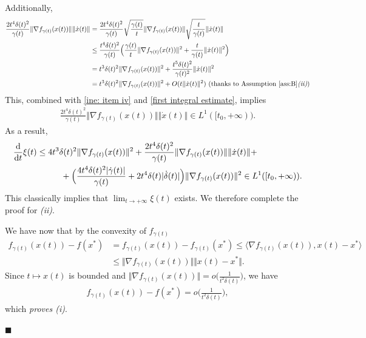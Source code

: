 \documentclass[11pt]{article}
\numberwithin{equation}{section}
\newenvironment{proof}{\bigskip\noindent{\bf Proof.}}{\hfill $\blacksquare$ \par\bigskip\noindent}
\begin{document}
\begin{proof}
Additionally,  
\begin{align*}
\frac{2t^4\delta(t)^2}{\gamma(t)}\Vert \nabla f_{\gamma(t)}(x(t)) \Vert \Vert \dot{x}(t) \Vert &=\frac{2t^4\delta(t)^2}{\gamma(t)}\sqrt{\frac{\gamma(t)}{t}}\Vert \nabla f_{\gamma(t)}(x(t)) \Vert \sqrt{\frac{t}{\gamma(t)}}\Vert \dot{x}(t) \Vert \\
&\le \frac{t^4\delta(t)^2}{\gamma(t)}\Big(\frac{\gamma(t)}{t}\Vert \nabla f _{\gamma(t)}(x(t)) \Vert^2+\frac{t}{\gamma(t)}\Vert \dot{x}(t) \Vert^2\Big) \\
&=t^3\delta(t)^2\Vert \nabla f _{\gamma(t)}(x(t)) \Vert^2+\frac{t^5\delta(t)^2}{\gamma(t)^2}\Vert \dot{x}(t) \Vert^2 \\
&=t^3\delta(t)^2\Vert \nabla f _{\gamma(t)}(x(t)) \Vert^2+O(t\Vert \dot{x}(t) \Vert^2) \text{ (thanks to Assumption \ref{ass:B}\textit{(ii)})}
\end{align*}
This, combined with \eqref{ine: item iv} and \eqref{first integral estimate}, implies 
\begin{align*}
 \frac{2t^4\delta(t)^2}{\gamma(t)}\Vert \nabla f_{\gamma(t)}(x(t)) \Vert \Vert \dot{x}(t) \Vert  \in L^1([t_0,+\infty)).   
\end{align*}
As a result, 
\begin{align*}
    \frac{\mathrm{d}}{\mathrm{d}t}\xi(t) 
    &\le 4t^3\delta(t)^2\Vert \nabla f_{\gamma(t)}(x(t)) \Vert^2+\frac{2t^4\delta(t)^2}{\gamma(t)}\Vert \nabla f_{\gamma(t)}(x(t)) \Vert \Vert \dot{x}(t) \Vert+\\&\hskip1cm+\Big(\frac{4t^4\delta(t)^2\vert \dot{\gamma}(t)\vert}{\gamma(t)}+2t^4\delta(t)\vert \dot{\delta}(t)\vert\Big)\Vert \nabla f_{\gamma(t)}(x(t)) \Vert^2 
    \in L^1([t_0,+\infty)). 
\end{align*}
This classically implies that $\lim_{t \to +\infty}\xi(t)$ exists. We therefore complete the proof for \textit{(ii)}. 

We have now that by the convexity of $f_{\gamma(t)}$
\begin{align*}
    f_{\gamma(t)}(x(t))-f(x^*)&=f_{\gamma(t)}(x(t))-f_{\gamma(t)}(x^*) \le \langle \nabla f_{\gamma(t)}(x(t)),x(t)-x^* \rangle \\
    &\le \Vert \nabla f_{\gamma(t)}(x(t)) \Vert \Vert x(t)-x^* \Vert.
\end{align*}
Since $t \mapsto x(t)$ is bounded and $\Vert \nabla f_{\gamma(t)}(x(t)) \Vert=o\Big(\frac{1}{t^2\delta(t)}\Big)$, we have 
\begin{align*}
f_{\gamma(t)}(x(t))-f(x^*)=  o\Big(\frac{1}{t^2\delta(t)}\Big),
\end{align*}
which \emph{proves \textit{(i)}}. 


\end{proof}
\end{document}

